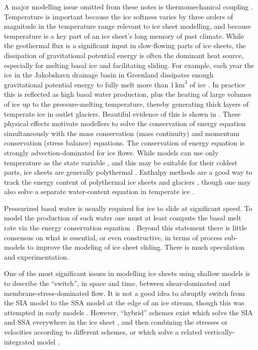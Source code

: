 \documentclass[letterpaper,final,12pt,reqno]{amsart}
\begin{document}
A major modelling issue omitted from these notes is thermomechanical coupling \cite{Blatteretal2010}.  Temperature is important because the ice softness varies by three orders of magnitude in the temperature range relevant to ice sheet modelling, and because temperature is a key part of an ice sheet's long memory of past climate.  While the geothermal flux is a significant input in slow-flowing parts of ice sheets, the dissipation of gravitational potential energy is often the dominant heat source, especially for melting basal ice and facilitating sliding.  For example, each year the ice in the Jakobshavn drainage basin in Greenland dissipates enough gravitational potential energy to fully melt more than $1\,\text{km}^3$ of ice \cite{AschwandenBuelerKhroulevBlatter}.  In practice this is reflected as high basal water production, plus the heating of large volumes of ice up to the pressure-melting temperature, thereby generating thick layers of temperate ice in outlet glaciers.  Beautiful evidence of this is shown in \cite{Luethietal2009}.  These physical effects motivate modellers to solve the conservation of energy equation simultaneously with the mass conservation (mass continuity) and momentum conservation (stress balance) equations.  The conservation of energy equation is strongly advection-dominated for ice flows.  While models can use only temperature as the state variable \cite{BBL}, and this may be suitable for their coldest parts, ice sheets are generally polythermal \cite{FowlerLarson1978,Greve}.  Enthalpy methods are a good way to track the energy content of polythermal ice sheets and glaciers \cite{AschwandenBuelerKhroulevBlatter,GreveBlatter2016}, though one may also solve a separate water-content equation in temperate ice \cite{Greve}.

Pressurized basal water is usually required for ice to slide at significant speed.  To model the production of such water one must at least compute the basal melt rate via the energy conservation equation \cite{BBssasliding,BuelervanPelt2015,Clarke05,Raymondenergy,Tulaczyketal2000b}.  Beyond this statement there is little consensus on what is essential, or even constructive, in terms of process sub-models to improve the modeling of ice sheet sliding.  There is much speculation and experimentation.

One of the most significant issues in modelling ice sheets using shallow models is to describe the ``switch'', in space and time, between shear-dominated and membrane-stress-dominated flow.  It is not a good idea to abruptly switch from the SIA model to the SSA model at the edge of an ice stream, though this was attempted in early models \cite{HulbeMacAyeal,Ritzetal2001}.  However, ``hybrid'' schemes exist which solve the SIA and SSA everywhere in the ice sheet \cite{BBssasliding,Winkelmannetal2011}, and then combining the stresses or velocities according to different schemes, or which solve a related vertically-integrated model \cite{BrinkerhoffJohnson2013,Goldberg2011,PollardDeConto}.
\end{document}
